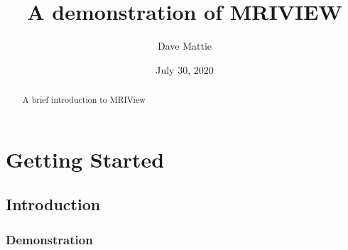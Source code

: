 \documentclass[]{report}
\begin{document}
\title{A demonstration of MRIVIEW}
\author{Dave Mattie}
\date{July 30, 2020}
\maketitle

\begin{abstract}
  A brief introduction to MRIView
\end{abstract}

\chapter{Getting Started} 
\section{Introduction}
\subsection{Demonstration}

\begin{thebibliography}{9}
\end{thebibliography}
\end{document}
